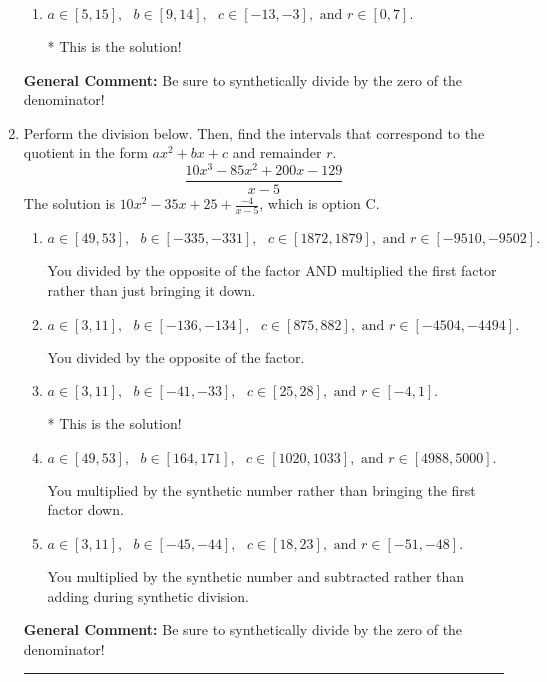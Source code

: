 \documentclass{extbook}[14pt]
\newcommand{\litem}[1]{\item #1

\rule{\textwidth}{0.4pt}}
\begin{document}
\begin{enumerate}
{\begin{enumerate}[label=\Alph*.]
 You multiplied by the synthetic number and subtracted rather than adding during synthetic division.
\item \( a \in [5, 15], \text{   } b \in [9, 14], \text{   } c \in [-13, -3], \text{   and   } r \in [0, 7]. \)

* This is the solution!
\end{enumerate}

\textbf{General Comment:} Be sure to synthetically divide by the zero of the denominator!
}
\litem{
Perform the division below. Then, find the intervals that correspond to the quotient in the form $ax^2+bx+c$ and remainder $r$.
\[ \frac{10x^{3} -85 x^{2} +200 x -129}{x -5} \]The solution is \( 10x^{2} -35 x + 25 + \frac{-4}{x -5} \), which is option C.\begin{enumerate}[label=\Alph*.]
\item \( a \in [49, 53], \text{   } b \in [-335, -331], \text{   } c \in [1872, 1879], \text{   and   } r \in [-9510, -9502]. \)

 You divided by the opposite of the factor AND multiplied the first factor rather than just bringing it down.
\item \( a \in [3, 11], \text{   } b \in [-136, -134], \text{   } c \in [875, 882], \text{   and   } r \in [-4504, -4494]. \)

 You divided by the opposite of the factor.
\item \( a \in [3, 11], \text{   } b \in [-41, -33], \text{   } c \in [25, 28], \text{   and   } r \in [-4, 1]. \)

* This is the solution!
\item \( a \in [49, 53], \text{   } b \in [164, 171], \text{   } c \in [1020, 1033], \text{   and   } r \in [4988, 5000]. \)

 You multiplied by the synthetic number rather than bringing the first factor down.
\item \( a \in [3, 11], \text{   } b \in [-45, -44], \text{   } c \in [18, 23], \text{   and   } r \in [-51, -48]. \)

 You multiplied by the synthetic number and subtracted rather than adding during synthetic division.
\end{enumerate}

\textbf{General Comment:} Be sure to synthetically divide by the zero of the denominator!
}
\end{enumerate}
\end{document}
